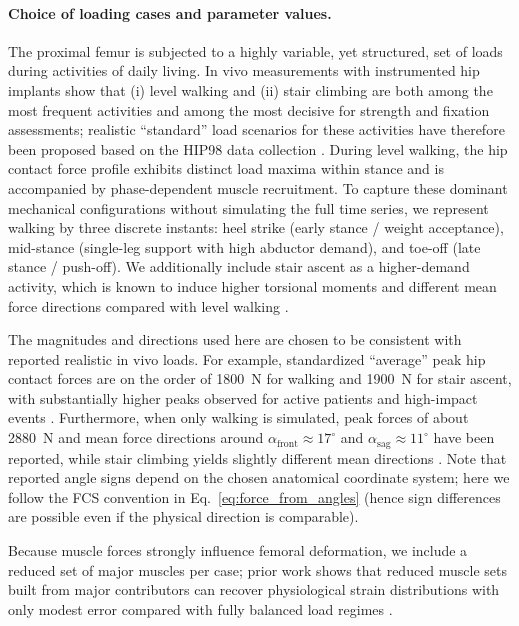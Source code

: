 \paragraph*{Choice of loading cases and parameter values.}
The proximal femur is subjected to a highly variable, yet structured, set of loads during activities of daily living.
In vivo measurements with instrumented hip implants show that (i) level walking and (ii) stair climbing are both among the most frequent activities and among the most decisive for strength and fixation assessments; realistic ``standard'' load scenarios for these activities have therefore been proposed based on the HIP98 data collection \cite{Bergmann2010_RealisticLoadsHipImplants,Bergmann2016_StandardizedLoadsHipImplants,OrthoLoadDatabase}.
During level walking, the hip contact force profile exhibits distinct load maxima within stance and is accompanied by phase-dependent muscle recruitment.
To capture these dominant mechanical configurations without simulating the full time series, we represent walking by three discrete instants: heel strike (early stance / weight acceptance), mid-stance (single-leg support with high abductor demand), and toe-off (late stance / push-off).
We additionally include stair ascent as a higher-demand activity, which is known to induce higher torsional moments and different mean force directions compared with level walking \cite{Bergmann2010_RealisticLoadsHipImplants,Bergmann2016_StandardizedLoadsHipImplants}.

The magnitudes and directions used here are chosen to be consistent with reported realistic in vivo loads.
For example, standardized ``average'' peak hip contact forces are on the order of 1800~N for walking and 1900~N for stair ascent, with substantially higher peaks observed for active patients and high-impact events \cite{Bergmann2010_RealisticLoadsHipImplants,OrthoLoadDatabase}.
Furthermore, when only walking is simulated, peak forces of about 2880~N and mean force directions around $\alpha_{\mathrm{front}}\approx 17^\circ$ and $\alpha_{\mathrm{sag}}\approx 11^\circ$ have been reported, while stair climbing yields slightly different mean directions \cite{Bergmann2016_StandardizedLoadsHipImplants}.
Note that reported angle signs depend on the chosen anatomical coordinate system; here we follow the FCS convention in Eq.~\eqref{eq:force_from_angles} (hence sign differences are possible even if the physical direction is comparable).

Because muscle forces strongly influence femoral deformation, we include a reduced set of major muscles per case; prior work shows that reduced muscle sets built from major contributors can recover physiological strain distributions with only modest error compared with fully balanced load regimes \cite{Duda1998_MuscleForcesFemoralStrain,Bergmann2016_StandardizedLoadsHipImplants}.

